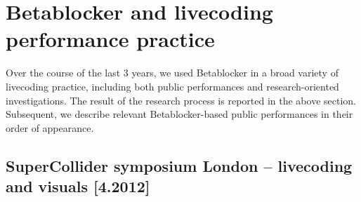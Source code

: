 \documentclass[letterpaper, 12pt]{article}
\begin{document}
% 
% 
% 
% 
% 
% 
% 
% 
% 
% 
% 
% 
% 


\section{Betablocker and livecoding performance practice} 
\label{sec:betablocker_and_livecoding_practice_a_report}

Over the course of the last 3 years, we used Betablocker in a broad variety of livecoding practice, including both public performances and research-oriented investigations.
The result of the research process is reported in the above section.
Subsequent, we describe relevant Betablocker-based public performances in their order of appearance.

\subsection{SuperCollider symposium London -- livecoding and visuals [4.2012]}
\label{sub:livecoding_and_visuals}
\end{document}
